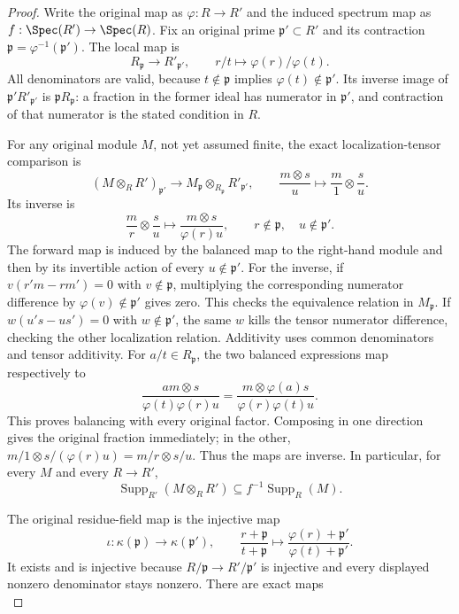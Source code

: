 \begin{proof}
Write the original map as $\varphi:R\to R'$ and the induced
spectrum map as $f:\Spec(R')\to\Spec(R)$.
Fix an original prime $\mathfrak p'\subset R'$ and its
contraction $\mathfrak p=\varphi^{-1}(\mathfrak p')$.
The local map is
$$
R_{\mathfrak p}\longrightarrow R'_{\mathfrak p'},
\qquad r/t\longmapsto\varphi(r)/\varphi(t).
$$
All denominators are valid, because $t\notin\mathfrak p$
implies $\varphi(t)\notin\mathfrak p'$. Its inverse image
of $\mathfrak p'R'_{\mathfrak p'}$ is
$\mathfrak pR_{\mathfrak p}$: a fraction in the former
ideal has numerator in $\mathfrak p'$, and contraction
of that numerator is the stated condition in $R$.

For any original module $M$, not yet assumed finite, the
exact localization-tensor comparison is
$$
(M\otimes_RR')_{\mathfrak p'}
\longrightarrow M_{\mathfrak p}\otimes_{R_{\mathfrak p}}R'_{\mathfrak p'},
\qquad \frac{m\otimes s}{u}\longmapsto\frac m1\otimes\frac su.
$$
Its inverse is
$$
\frac mr\otimes\frac su
\longmapsto\frac{m\otimes s}{\varphi(r)u},
\qquad r\notin\mathfrak p,\quad u\notin\mathfrak p'.
$$
The forward map is induced by the balanced map to the
right-hand module and then by its invertible action of
every $u\notin\mathfrak p'$. For the inverse, if
$v(r'm-rm')=0$ with $v\notin\mathfrak p$, multiplying
the corresponding numerator difference by
$\varphi(v)\notin\mathfrak p'$ gives zero. This checks
the equivalence relation in $M_{\mathfrak p}$. If
$w(u's-us')=0$ with $w\notin\mathfrak p'$, the same
$w$ kills the tensor numerator difference, checking the
other localization relation. Additivity uses common
denominators and tensor additivity. For $a/t\in R_{\mathfrak p}$,
the two balanced expressions map respectively to
$$
\frac{am\otimes s}{\varphi(t)\varphi(r)u}
=\frac{m\otimes\varphi(a)s}{\varphi(r)\varphi(t)u}.
$$
This proves balancing with every original factor. Composing
in one direction gives the original fraction immediately;
in the other, $m/1\otimes s/(\varphi(r)u)=m/r\otimes s/u$.
Thus the maps are inverse. In particular, for every $M$
and every $R\to R'$,
$$
\operatorname{Supp}_{R'}(M\otimes_RR')
\subseteq f^{-1}\operatorname{Supp}_R(M).
$$

The original residue-field map is the injective map
$$
\iota:\kappa(\mathfrak p)\longrightarrow\kappa(\mathfrak p'),
\qquad
\frac{r+\mathfrak p}{t+\mathfrak p}
\longmapsto
\frac{\varphi(r)+\mathfrak p'}{\varphi(t)+\mathfrak p'}.
$$
It exists and is injective because $R/\mathfrak p\to
R'/\mathfrak p'$ is injective and every displayed
nonzero denominator stays nonzero. There are exact maps
\[

\]
\end{proof}
